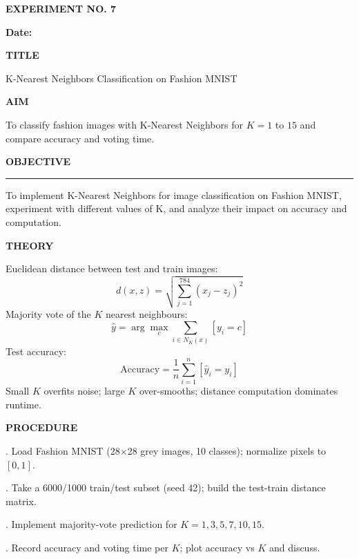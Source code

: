 \documentclass[11pt,twoside]{article}
\newcommand{\expheading}[1]{{\fontsize{14}{17}\selectfont\textbf{#1}\par}}
\newcommand{\fullrule}{\noindent\rule{\textwidth}{0.6pt}\par}
\begin{document}
\sloppy

{\setlength{\parskip}{1pt}\setlength{\abovedisplayskip}{2pt}\setlength{\belowdisplayskip}{2pt}
\begin{center}
\expheading{EXPERIMENT NO. 7}
\end{center}
\vspace{2pt}

\noindent\textbf{Date:} \underline{\hspace{2.6cm}}\par
\vspace{6pt}

\expheading{TITLE}
\vspace{4pt}
\noindent K-Nearest Neighbors Classification on Fashion MNIST\par
\vspace{4pt}

\expheading{AIM}
\vspace{4pt}
\noindent To classify fashion images with K-Nearest Neighbors for $K=1$ to $15$ and compare accuracy and voting time. \par
\vspace{4pt}

\expheading{OBJECTIVE}
\vspace{2pt}
\fullrule
\vspace{4pt}
\noindent To implement K-Nearest Neighbors for image classification on Fashion MNIST, experiment with different values of K, and analyze their impact on accuracy and computation. \par
\vspace{4pt}

\expheading{THEORY}
\vspace{4pt}
Euclidean distance between test and train images:
\[d(x,z)=\sqrt{\sum_{j=1}^{784}(x_j-z_j)^2}\]
Majority vote of the $K$ nearest neighbours:
\[\hat{y}=\arg\max_c\sum_{i\in N_K(x)}[y_i=c]\]
Test accuracy:
\[\text{Accuracy}=\frac{1}{n}\sum_{i=1}^{n}[\hat{y}_i=y_i]\]
Small $K$ overfits noise; large $K$ over-smooths; distance computation dominates runtime.
\vspace{4pt}

\expheading{PROCEDURE}
\vspace{4pt}
. Load Fashion MNIST (28$\times$28 grey images, 10 classes); normalize pixels to $[0,1]$.\par
{}. Take a 6000/1000 train/test subset (seed 42); build the test-train distance matrix.\par
{}. Implement majority-vote prediction for $K=1,3,5,7,10,15$.\par
{}. Record accuracy and voting time per $K$; plot accuracy vs $K$ and discuss. \par
\vspace{4pt}

}
\end{document}
